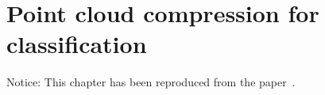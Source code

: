 \chapter{Point cloud compression for classification}

\begingroup

\setlength\aboverulesep{0.3827ex+0.1\normalbaselineskip}
\setlength\belowrulesep{0.6219ex+0.1\normalbaselineskip}


\begin{center}
  \small
  Notice: This chapter has been reproduced from the paper~\cite{ulhaq2023pointcloud}.
\end{center}




%
%
%


